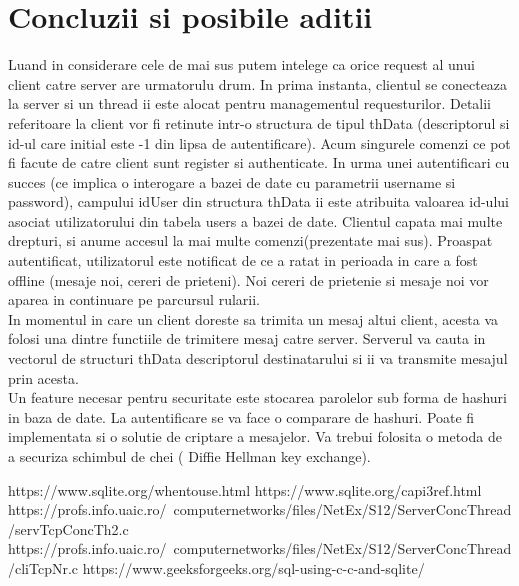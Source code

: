\documentclass[runningheads]{llncs}
\begin{document}
\section{Concluzii si posibile aditii}
Luand in considerare cele de mai sus putem intelege ca orice request al unui client catre server are urmatorulu drum. In prima instanta, clientul se conecteaza la server si un thread ii este alocat pentru managementul requesturilor. Detalii referitoare la client vor fi retinute intr-o structura de tipul thData (descriptorul si id-ul care initial este -1 din lipsa de autentificare). Acum singurele comenzi ce pot fi facute de catre client sunt register si authenticate. In urma unei autentificari cu succes (ce implica o interogare a bazei de date cu parametrii username si password), campului idUser din structura thData ii este atribuita valoarea id-ului asociat utilizatorului din tabela users a bazei de date. Clientul capata mai multe drepturi, si anume accesul la mai multe comenzi(prezentate mai sus). Proaspat autentificat, utilizatorul este notificat de ce a ratat in perioada in care a fost offline (mesaje noi, cereri de prieteni). Noi cereri de prietenie si mesaje noi vor aparea in continuare pe parcursul rularii.\\
In momentul in care un client doreste sa trimita un mesaj altui client, acesta va folosi una dintre functiile de trimitere mesaj catre server. Serverul va cauta in vectorul de structuri thData descriptorul destinatarului si ii va transmite mesajul prin acesta.\\
Un feature necesar pentru securitate este stocarea parolelor sub forma de hashuri in baza de date. La autentificare se va face o comparare de hashuri.
Poate fi implementata si o solutie de criptare a mesajelor. Va trebui folosita o metoda de a securiza schimbul de chei ( Diffie Hellman key exchange).\\
\begin{thebibliography}{8}
https://www.sqlite.org/whentouse.html
https://www.sqlite.org/capi3ref.html
https://profs.info.uaic.ro/~computernetworks/files/NetEx/S12/ServerConcThread/servTcpConcTh2.c
https://profs.info.uaic.ro/~computernetworks/files/NetEx/S12/ServerConcThread/cliTcpNr.c
https://www.geeksforgeeks.org/sql-using-c-c-and-sqlite/
\end{thebibliography}
\end{document}
